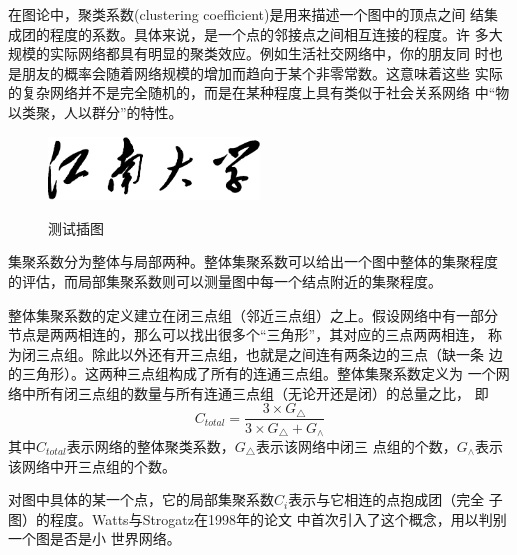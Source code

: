 \documentclass[bachelor,winfonts]{jnuthesis}
\begin{document}
    在图论中，聚类系数(clustering coefficient)是用来描述一个图中的顶点之间
    结集成团的程度的系数。具体来说，是一个点的邻接点之间相互连接的程度。许
    多大规模的实际网络都具有明显的聚类效应。例如生活社交网络中，你的朋友同
    时也是朋友的概率会随着网络规模的增加而趋向于某个非零常数。这意味着这些
    实际的复杂网络并不是完全随机的，而是在某种程度上具有类似于社会关系网络
    中“物以类聚，人以群分”的特性。
    
    \begin{figure}[htbp]
        \centering
        \includegraphics[width= 0.5\textwidth]{jnuname}\\
        \caption{测试插图}\label{fig:test4}
    \end{figure}
    
    集聚系数分为整体与局部两种。整体集聚系数可以给出一个图中整体的集聚程度
    的评估，而局部集聚系数则可以测量图中每一个结点附近的集聚程度。
    
    \begin{definition}[整体聚类系数]
        整体集聚系数的定义建立在闭三点组（邻近三点组）之上。假设网络中有一部分
        节点是两两相连的，那么可以找出很多个“三角形”，其对应的三点两两相连，
        称为闭三点组。除此以外还有开三点组，也就是之间连有两条边的三点（缺一条
        边的三角形）。这两种三点组构成了所有的连通三点组。整体集聚系数定义为
        一个网络中所有闭三点组的数量与所有连通三点组（无论开还是闭）的总量之比，
        即
        \[
        C_{total}=\frac{3\times G_{\triangle}}{3 \times G_{\triangle} + G_{\wedge}}
        \]
        其中$C_{total}$表示网络的整体聚类系数，$G_{\triangle}$表示该网络中闭三
        点组的个数，$G_{\wedge}$表示该网络中开三点组的个数\cite{luce1949method}。
    \end{definition}
    
    对图中具体的某一个点，它的局部集聚系数$C_i$表示与它相连的点抱成团（完全
    子图）的程度。Watts与Strogatz在1998年的论文
    \cite{watts1998smallworld}中首次引入了这个概念，用以判别一个图是否是小
    世界网络。
    
\end{document}
